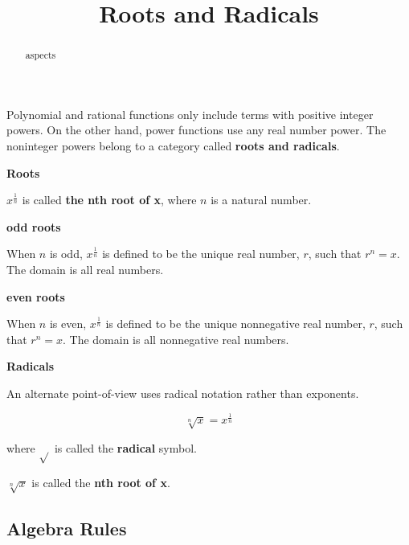 \documentclass{ximera}
\title{Roots and Radicals}
\begin{document}
\begin{abstract}
aspects
\end{abstract}
\maketitle





Polynomial and rational functions only include terms with positive integer powers. On the other hand, power functions use any real number power.  The noninteger powers belong to a category called \textbf{roots and radicals}.



\begin{definition} \textbf{\textcolor{green!50!black}{Roots}}

$x^{\tfrac{1}{n}}$ is called \textbf{the nth root of x}, where $n$ is a natural number.




\textbf{odd roots}

When $n$ is odd, $x^{\tfrac{1}{n}}$ is defined to be the unique real number, $r$, such that $r^n = x$. The domain is all real numbers.




\textbf{even roots}

When $n$ is even, $x^{\tfrac{1}{n}}$ is defined to be the unique nonnegative real number, $r$, such that $r^n = x$. The domain is all nonnegative real numbers.


\end{definition}



\begin{definition} \textbf{\textcolor{green!50!black}{Radicals}}

An alternate point-of-view uses radical notation rather than exponents.

\[   \sqrt[n]{x} =  x^{\tfrac{1}{n}}     \]

where $\sqrt{ }$ is called the \textbf{radical} symbol.


$\sqrt[n]{x}$ is called the \textbf{nth root of x}.

\end{definition}




\subsection*{Algebra Rules}
\end{document}

